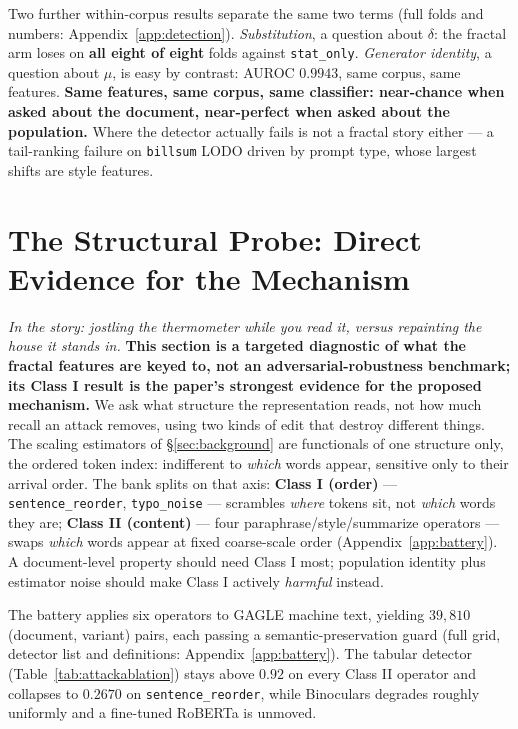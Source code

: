 \documentclass{article}
\newcommand{\arm}[1]{\texttt{#1}}
\begin{document}
Two further within-corpus results separate the same two terms (full folds and
numbers: Appendix~\ref{app:detection}). \emph{Substitution}, a question about
$\delta$: the fractal arm loses on \textbf{all eight of eight} folds against
\arm{stat\_only}. \emph{Generator identity}, a question about $\mu$, is easy
by contrast: AUROC $0.9943$, same corpus, same features. \textbf{Same
features, same corpus, same classifier: near-chance when asked about the
document, near-perfect when asked about the population.} Where the detector
actually fails is not a fractal story either --- a tail-ranking failure on
\texttt{billsum} LODO driven by prompt type, whose largest shifts are style
features.

\section{The Structural Probe: Direct Evidence for the Mechanism}
\label{sec:perturb}

\emph{In the story: jostling the thermometer while you read it, versus
repainting the house it stands in.} \textbf{This section is a targeted
diagnostic of what the fractal features are keyed to, not an
adversarial-robustness benchmark; its Class I result is the paper's
strongest evidence for the proposed mechanism.} We ask what structure the
representation reads, not how much recall an attack removes, using two kinds
of edit that destroy different things. The scaling estimators of
\S\ref{sec:background} are functionals of one structure only, the ordered
token index: indifferent to \emph{which} words appear, sensitive only to
their arrival order. The bank splits on that axis: \textbf{Class I (order)}
--- \texttt{sentence\_reorder}, \texttt{typo\_noise} --- scrambles
\emph{where} tokens sit, not \emph{which} words they are; \textbf{Class II
(content)} --- four paraphrase/style/summarize operators --- swaps
\emph{which} words appear at fixed coarse-scale order
(Appendix~\ref{app:battery}). A document-level property should need Class I
most; population identity plus estimator noise should make Class I actively
\emph{harmful} instead.

The battery applies six operators to GAGLE machine text, yielding $39{,}810$
(document, variant) pairs, each passing a semantic-preservation guard (full
grid, detector list and definitions: Appendix~\ref{app:battery}). The tabular
detector (Table~\ref{tab:attackablation}) stays above $0.92$ on every Class
II operator and collapses to $0.2670$ on \texttt{sentence\_reorder}, while
Binoculars \citep{hans2024binoculars} degrades roughly uniformly and a
fine-tuned RoBERTa is unmoved.
\end{document}
